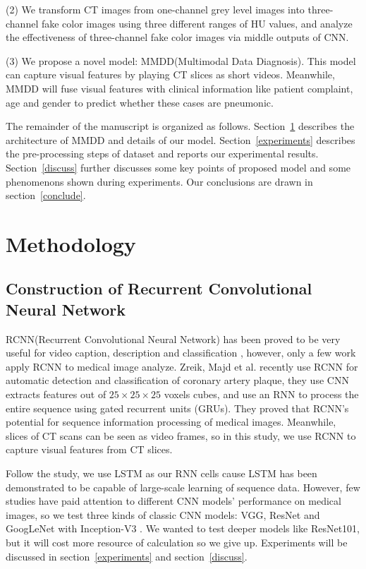 \documentclass[journal]{IEEEtran}
\begin{document}
(2) We transform CT images from one-channel grey level images into three-channel fake color images using three different ranges of HU values, and analyze the effectiveness of three-channel fake color images via middle outputs of CNN.

(3) We propose a novel model: MMDD(Multimodal Data Diagnosis). This model can capture visual features by playing CT slices as short videos. Meanwhile, MMDD will fuse visual features with clinical information like patient complaint, age and gender to predict whether these cases are pneumonic.

The remainder of the manuscript is organized as follows. 
Section~\ref{methodology} describes the architecture of MMDD and details of our model.
Section~\ref{experiments} describes the pre-processing steps of dataset and reports our experimental results.
Section~\ref{discuss} further discusses some key points of proposed model and some phenomenons shown during experiments.
Our conclusions are drawn in section~\ref{conclude}.

\section{Methodology}
\label{methodology}

\subsection{Construction of Recurrent Convolutional Neural Network}
\label{RCNN}
RCNN(Recurrent Convolutional Neural Network) has been proved to be very useful for video caption, description and classification \cite{Donahue2015Long}\cite{Aafaq2019Spatio}, however, only a few work apply RCNN to medical image analyze. Zreik, Majd et al. \cite{Zreik2018A} recently use RCNN for automatic detection and classification of coronary artery plaque, they use CNN extracts features out of $ 25\times25\times25$ voxels cubes, and  use an RNN to process the entire sequence using gated recurrent units (GRUs)\cite{chung2014empirical}. They proved that RCNN's potential for sequence information processing of medical images. Meanwhile, slices of CT scans can be seen as video frames, so in this study, we use RCNN to capture visual features from CT slices.

Follow the study\cite{Donahue2015Long}, we use LSTM as our RNN cells cause LSTM has been demonstrated to be capable of large-scale learning of sequence data. However, few studies have paid attention to different CNN models' performance on medical images, so we test three kinds of classic CNN models: VGG\cite{simonyan2015very}, ResNet\cite{he2016deep} and GoogLeNet with Inception-V3 \cite{szegedy2016rethinking}. 
We wanted to test deeper models like ResNet101, but it will cost more resource of calculation so we give up. Experiments will be discussed in section~\ref{experiments} and section~\ref{discuss}.
\end{document}
